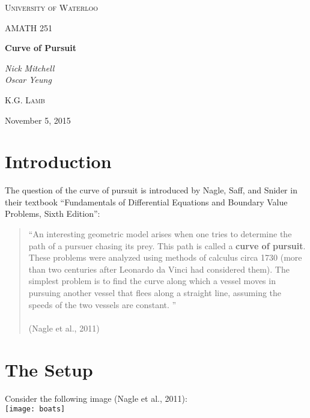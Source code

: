 \documentclass[12pt]{article}
\begin{document}
	
	
	\begin{titlepage}
        \centering
		{\scshape\LARGE University of Waterloo \par}
		\vspace{1cm}
		{\scshape\Large AMATH 251\par}
		\vspace{1.5cm}
		{\huge\bfseries Curve of Pursuit \par}
		\vspace{2cm}
		{\Large\itshape Nick Mitchell\\Oscar Yeung\par}
		\vfill
		\par
		\textsc{K.G. Lamb}
		\vfill
		{\large November 5, 2015 \par}
	\end{titlepage}
	
	\section{Introduction}
	
	The question of the curve of pursuit is introduced by Nagle, Saff, and Snider in their textbook \textquotedblleft Fundamentals of Differential Equations and Boundary Value Problems, Sixth Edition\textquotedblright :
	
	\begin{quotation}
\textquotedblleft An interesting geometric model arises when one tries to determine the path of a pursuer chasing its prey. This path is called a \textbf{curve of pursuit}. These problems were analyzed using methods of calculus circa 1730 (more than two centuries after Leonardo da Vinci had considered them). The simplest problem is to find the curve along which a vessel moves in pursuing another vessel that flees along a straight line, assuming the speeds of the two vessels are constant. \textquotedblright \\
\\ 
\indent (Nagle et al., 2011)
	\end{quotation}

	
	\section{The Setup}
	
    \indent Consider the following image (Nagle et al., 2011): \\
	\texttt{[image: boats]}
	\\
\end{document}
